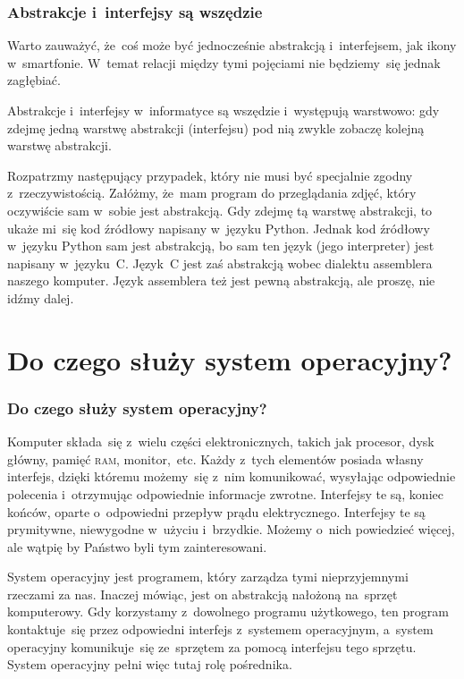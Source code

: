 \documentclass[10pt,t]{beamer}
\begin{document}
\begin{frame}
  \frametitle{Abstrakcje i~interfejsy są wszędzie}


  Warto zauważyć, że~coś może być jednocześnie abstrakcją i~interfejsem,
  jak ikony w~smartfonie. W~temat relacji między tymi pojęciami nie
  będziemy~się jednak zagłębiać.

  Abstrakcje i~interfejsy w~informatyce są wszędzie i~występują warstwowo:
  gdy zdejmę jedną warstwę abstrakcji (interfejsu) pod nią zwykle zobaczę
  kolejną warstwę abstrakcji.

  Rozpatrzmy następujący przypadek, który nie musi być specjalnie zgodny
  z~rzeczywistością. Załóżmy, że~mam program do przeglądania zdjęć, który
  oczywiście sam w~sobie jest abstrakcją. Gdy zdejmę tą warstwę abstrakcji,
  to ukaże mi~się kod źródłowy napisany w~języku Python. Jednak kod
  źródłowy w~języku Python sam jest \alert{abstrakcją}, bo sam ten język
  (jego interpreter) jest napisany w~języku~C. Język~C jest zaś abstrakcją
  wobec dialektu assemblera naszego komputer. Język assemblera też jest
  pewną abstrakcją, ale proszę, nie idźmy dalej.

\end{frame}










\section{Do czego służy system operacyjny?}


\begin{frame}
  \frametitle{Do czego służy system operacyjny?}


  Komputer składa~się z~wielu części elektronicznych, takich jak procesor,
  dysk główny, pamięć \textsc{ram}, monitor,~etc. Każdy z~tych elementów
  posiada własny interfejs, dzięki któremu możemy~się z~nim komunikować,
  wysyłając odpowiednie polecenia i~otrzymując odpowiednie informacje
  zwrotne. Interfejsy te są, koniec końców, oparte o~odpowiedni przepływ
  prądu elektrycznego. Interfejsy te są prymitywne, niewygodne w~użyciu
  i~brzydkie. Możemy o~nich powiedzieć więcej, ale wątpię by Państwo byli
  tym zainteresowani.

  System operacyjny jest programem, który zarządza tymi nieprzyjemnymi
  rzeczami za nas. Inaczej mówiąc, jest on abstrakcją nałożoną na~sprzęt
  komputerowy. Gdy korzystamy z~dowolnego programu użytkowego, ten program
  kontaktuje~się przez odpowiedni interfejs z~systemem operacyjnym,
  a~system operacyjny komunikuje~się ze~sprzętem za pomocą interfejsu tego
  sprzętu. System operacyjny pełni więc tutaj rolę pośrednika.

\end{frame}
\end{document}

